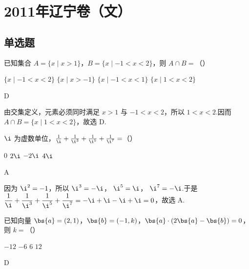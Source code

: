 \chapter{2011年辽宁卷（文）}

\section{单选题}

\begin{problem}
已知集合 \(A = \{x \mid x > 1\}\)，\(B = \{x \mid -1 < x < 2\}\)，则 \(A \cap B =\)（\quad）

\choices
    {\(\{x\mid -1 < x < 2\}\)}
    {\( \{x \mid x > -1\} \)}
    {\( \{x \mid -1 < x < 1\} \)}
    {\( \{x \mid 1 < x < 2\} \)}
\end{problem}

\begin{answer}
D
\end{answer}

\begin{solution}
由交集定义，元素必须同时满足 \(x>1\) 与 \(-1<x<2\)，所以 \(1<x<2\).因而 \(A\cap B=\{x\mid 1<x<2\}\)，故选 D.
\end{solution}

\begin{problem}
\(\i\) 为虚数单位，\(\frac{1}{\i} + \frac{1}{\i^{3}} + \frac{1}{\i^{5}} + \frac{1}{\i^{7}} =\)（\quad）

\choices
    {\(0\)}
    {\(2\i\)}
    {\(-2\i\)}
    {\(4\i\)}
\end{problem}

\begin{answer}
A
\end{answer}

\begin{solution}
因为 \(\i^2=-1\)，所以 \(\i^3=-\i\)，\(\ \i^5=\i\)，\(\ \i^7=-\i\).于是
\(\displaystyle \frac{1}{\i}+\frac{1}{\i^3}+\frac{1}{\i^5}+\frac{1}{\i^7}
=-\i+\i-\i+\i=0\)，故选 A.
\end{solution}

\begin{problem}
已知向量 \(\bs{a} = (2,1)\)，\(\bs{b} = (-1,k)\)，\(\bs{a} \cdot (2\bs{a} - \bs{b}) = 0\)，则 \(k =\)（\quad）

\choices
    {\(-12\)}
    {\(-6\)}
    {\(6\)}
    {\(12\)}
\end{problem}

\begin{answer}
D
\end{answer}

